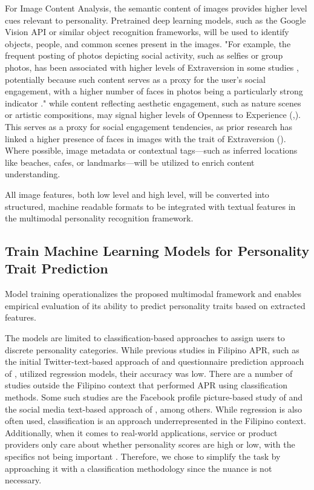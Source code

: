 	For Image Content Analysis, the semantic content of images provides higher level cues relevant to personality. Pretrained deep learning models, such as the Google Vision API or similar object recognition frameworks, will be used to identify objects, people, and common scenes present in the images. "For example, the frequent posting of photos depicting social activity, such as selfies or group photos, has been associated with higher levels of Extraversion in some studies \citep{Barry2019, Danciu2021}, potentially because such content serves as a proxy for the user's social engagement, with a higher number of faces in photos being a particularly strong indicator \citep{Celli2014}."  while content reflecting aesthetic engagement, such as nature scenes or artistic compositions, may signal higher levels of Openness to Experience (\citep{Guntuku2017},\citep{Silvia2015}). This serves as a proxy for social engagement tendencies, as prior research has linked a higher presence of faces in images with the trait of Extraversion (\citep{Celli2014, Ferwerda2016}). Where possible, image metadata or contextual tags—such as inferred locations like beaches, cafes, or landmarks—will be utilized to enrich content understanding.
	
	All image features, both low level and high level, will be converted into structured, machine readable formats to be integrated with textual features in the multimodal personality recognition framework.
	
	\subsection{Train Machine Learning Models for Personality Trait Prediction
	}
	
	Model training operationalizes the proposed multimodal framework and enables empirical evaluation of its ability to predict personality traits based on extracted features.
 
	The models are limited to classification-based approaches to assign users to discrete personality categories. While previous studies in Filipino APR, such as the initial Twitter-text-based approach of \citet{tighe_acorda_2022} and questionnaire prediction approach of \citet{gomez2024modeling}, utilized regression models, their accuracy was low. There are a number of studies outside the Filipino context that performed APR using classification methods. Some such studies are the Facebook profile picture-based study of \citet{celli_automatic_2014} and the social media text-based approach of \citet{Christian2021}, among others. While regression is also often used, classification is an approach underrepresented in the Filipino context. Additionally, when it comes to real-world applications, service or product providers only care about whether personality scores are high or low, with the specifics not being important \citep{wei2017beyond}. Therefore, we chose to simplify the task by approaching it with a classification methodology since the nuance is not necessary.


